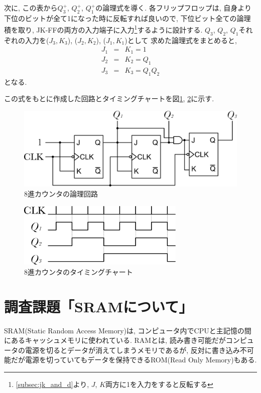 \documentclass[titlepage]{jsarticle}
\begin{document}
    次に, この表から$Q_3^+$, $Q_2^+$, $Q_1^+$の論理式を導く.
    各フリップフロップは, 自身より下位のビットが全て1になった時に反転すれば良いので,
    下位ビット全ての論理積を取り,
    JK-FFの両方の入力端子に入力\footnote{\ref{subsec:jk_and_d}より,
    $J$, $K$両方に1を入力をすると反転する}するように設計する.
    $Q_3$, $Q_2$, $Q_1$それぞれの入力を($J_3, K_3$), ($J_2, K_2$), ($J_1, K_1$)として
    求めた論理式をまとめると,
    \begin{eqnarray*}
      J_1 &=& K_1 = 1 \\
      J_2 &=& K_2 = Q_1 \\
      J_3 &=& K_3 = Q_1Q_2
    \end{eqnarray*}
    となる.

    この式をもとに作成した回路とタイミングチャートを図\ref{fig:counter}, \ref{fig:counter_timing}に示す.
    \begin{figure}[h]
      \centering
      \includegraphics[width=13cm]{images/counter.pdf}
      \caption{8進カウンタの論理回路}
      \label{fig:counter}
    \end{figure}

    \begin{figure}
      \centering
      \includegraphics[width=8cm]{images/counter_timing.pdf}
      \caption{8進カウンタのタイミングチャート}
      \label{fig:counter_timing}
    \end{figure}

\section{調査課題「SRAMについて」}
  SRAM(Static Random Access Memory)は, コンピュータ内でCPUと主記憶の間にあるキャッシュメモリに使われている.
  RAMとは, 読み書き可能だがコンピュータの電源を切るとデータが消えてしまうメモリであるが,
  反対に書き込み不可能だが電源を切っていてもデータを保持できるROM(Read Only Memory)もある.
\end{document}
